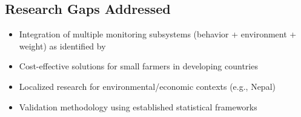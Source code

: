 \documentclass[../main.tex]{subfiles}
\begin{document}
\subsection{Research Gaps Addressed}

\begin{itemize}
    \item Integration of multiple monitoring subsystems (behavior + environment + weight) as identified by \cite{ojo2022internet}
    \item Cost-effective solutions for small farmers in developing countries \cite{karun2024iot}
    \item Localized research for environmental/economic contexts (e.g., Nepal)
    \item Validation methodology using established statistical frameworks \cite{bland1986agreement, koo2016icc}
\end{itemize}
\end{document}

